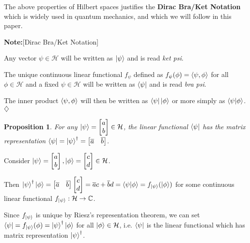 \documentclass[12pt,twoside,fleqn]{report}
\makeatletter
\theoremstyle{thmstyle}
\renewenvironment{proof}[1][\proofname]{\par
\pushQED{\qed}%
\normalfont \topsep6\p@\@plus6\p@\relax
\trivlist
\item[\hskip\labelsep\itshape#1\@addpunct{.}]\mbox{}\par\nobreak\ignorespaces
}{%
    \popQED\endtrivlist\@endpefalse
    }
\newtheorem{prop}{Proposition}[chapter]
\newenvironment{note}{\textbf{Note:}}{\hfill\ensuremath{\diamondsuit}}
\makeatother
\begin{document}
The above properties of Hilbert spaces justifies the \textbf{Dirac Bra/Ket Notation} which is widely used in quantum mechanics, and which we will follow in this paper.

\begin{note}[Dirac Bra/Ket Notation]

    Any vector $\psi \in \mathcal{H}$ will be written as $\ket{\psi}$ and is read \textit{ket psi}.

    The unique continuous linear functional $f_\psi$ defined as $f_{\psi}(\phi) = \braket{\psi, \phi}$ for all $\phi \in \mathcal{H}$ and a fixed $\psi \in \mathcal{H}$ will be written as $\bra{\psi}$ and is read \textit{bra psi}.

    The inner product $\braket{\psi, \phi}$ will then be written as $\bra{\psi} \ket{\phi}$ or more simply as $\braket{\psi|\phi}$.
\end{note}

\begin{prop}
    For any $\ket{\psi} = \begin{bmatrix} a \\ b\end{bmatrix} \in \mathcal{H}$, the linear functional $\bra{\psi}$ has the matrix representation $\bra\psi = \ket{\psi}^\dagger = \begin{bmatrix} \overline{a} & \overline{b} \end{bmatrix}$. 
\end{prop}
\begin{proof}

    Consider $\ket{\psi} = \begin{bmatrix} a \\ b\end{bmatrix}, \ket{\phi} = \begin{bmatrix} c \\ d \end{bmatrix} \in \mathcal{H}$.

        Then $\ket{\psi}^\dagger \ket{\phi} = \begin{bmatrix}\overline{a} & \overline{b} \end{bmatrix}  \begin{bmatrix} c \\ d \end{bmatrix} = \overline{a} c + \overline{b} d = \braket{\psi|\phi} = f_{\ket{\psi}}(\ket{\phi})$ for some continuous linear functional $f_{\ket{\psi}}: \mathcal{H} \to \mathbb{C}$.

            Since $f_{\ket\psi}$ is unique by Riesz's representation theorem, we can set $\bra{\psi} = f_{\ket\psi}(\phi) = \ket{\psi}^\dagger \ket{\phi}$ for all $\ket\phi \in \mathcal{H}$, i.e. $\bra{\psi}$ is the linear functional which has matrix representation $\ket{\psi}^\dagger$.
\end{proof}
\end{document}
